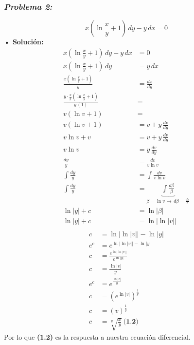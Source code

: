 \documentclass[letterpaper, 12pt]{article}
\begin{document}
\subsubsection*{\emph{Problema 2:}}
\justify
\[x\left(\ln \frac{x}{y} + 1\right)\, dy - y\, dx=0\]
\textbf{ • Solución:}
    \begin{equation*}
        \begin{aligned}
            x\left(\ln \frac{x}{y} + 1\right)\, dy - y\, dx&=0\\[5pt]
            x\left(\ln \frac{x}{y} + 1\right)\, dy&=y\, dx\\[5pt]
            \frac{x\left(\ln \frac{x}{y} + 1\right)}{y}&=\frac{dx}{dy}\\[5pt]
            \frac{y\cdot \frac{x}{y}\left(\ln \frac{x}{y} + 1\right)}{y\, (1)}&=\\[5pt]
            v\left(\ln v + 1\right)&=\\[5pt]
            v\left(\ln v + 1\right)&=v+y\, \frac{dv}{dy}\\[5pt]
            v\ln v + v &= v+y\, \frac{dv}{dy}\\[5pt]
            v\ln v&=y\, \frac{dv}{dy}\\[5pt]
            \frac{dy}{y}&=\frac{dv}{v\ln v}\\[5pt]
            \int\frac{dy}{y}&=\int\frac{dv}{v\ln v}\\[5pt]
            \int\frac{dy}{y}&=\underbrace{\int\frac{d\beta}{\beta}}_{\beta=\ln v\,\rightarrow\, d\beta=\frac{dv}{v}}\\[5pt]
            \ln|y|+c&=\ln|\beta|\\[5pt]
            \ln|y|+c&=\ln|\ln|v||\\[5pt]
        \end{aligned}
    \end{equation*}
    \begin{equation*}
        \begin{aligned}
            c&=\ln|\ln|v||-\ln|y|\\[5pt]
            e^c&=e^{\ln|\ln|v||-\ln|y|}\\[5pt]
            c&=\frac{e^{\ln|\ln|v||}}{e^{\ln|y|}}\\[5pt]
            c&=\frac{\ln|v|}{y}\\[5pt]
            e^c&=e^{\frac{\ln|v|}{y}}\\[5pt]
            c&=\left(e^{\ln|v|}\right)^{\frac{1}{y}}\\[5pt]
            c&=\left(v\right)^{\frac{1}{y}}\\[5pt]
            c&=\sqrt[y]{\frac{x}{y}}\: \textbf{(1.2)}
        \end{aligned}
    \end{equation*}
    Por lo que \textbf{(1.2)} es la respuesta a nuestra ecuación diferencial.
\end{document}
